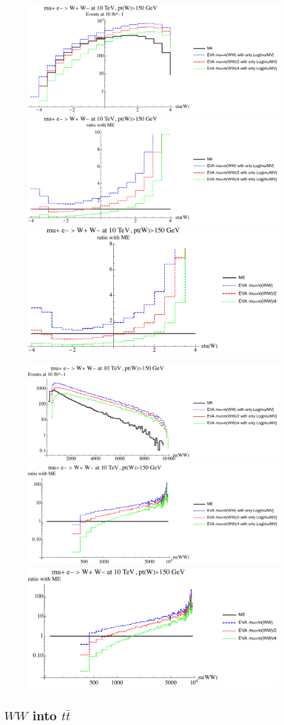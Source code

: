 \documentclass[a4paper,11pt]{article}
\begin{document}
\begin{figure}[ht]
\includegraphics[width=0.4\linewidth]{PlotDistr/WW_WW/10TeVolnlyptcut/plotetaW.pdf}
\includegraphics[width=0.4\linewidth]{PlotDistr/WW_WW/10TeVolnlyptcut/plotetaWratio1.pdf}
\includegraphics[width=0.4\linewidth]{PlotDistr/WW_WW/10TeVolnlyptcut/plotetaWratio2.pdf}
\end{figure}

\begin{figure}[ht]
\includegraphics[width=0.4\linewidth]{PlotDistr/WW_WW/10TeVolnlyptcut/plotmWW.pdf}
\includegraphics[width=0.4\linewidth]{PlotDistr/WW_WW/10TeVolnlyptcut/plotmWWratio1.pdf}
\includegraphics[width=0.4\linewidth]{PlotDistr/WW_WW/10TeVolnlyptcut/plotmWWratio2.pdf}
\end{figure}

\clearpage
\subsection{$WW$ into $t \bar t$}
\end{document}
